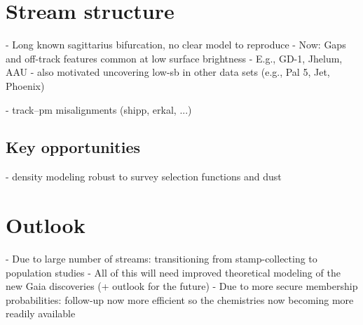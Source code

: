 \documentclass[final,5p,times,twocolumn,authoryear]{elsarticle}
\begin{document}
\section{Stream structure}
\label{sec:structure}
- Long known sagittarius bifurcation, no clear model to reproduce
- Now: Gaps and off-track features common at low surface brightness
- E.g., GD-1, Jhelum, AAU
- also motivated uncovering low-sb in other data sets (e.g., Pal 5, Jet, Phoenix)

- track--pm misalignments (shipp, erkal, ...)

\subsection{Key opportunities}
- density modeling robust to survey selection functions and dust


\section{Outlook}
\label{sec:outlook}
- Due to large number of streams: transitioning from stamp-collecting to population studies
- All of this will need improved theoretical modeling of the new Gaia discoveries (+ outlook for the future)
- Due to more secure membership probabilities: follow-up now more efficient so the chemistries now becoming more readily available







\end{document}
